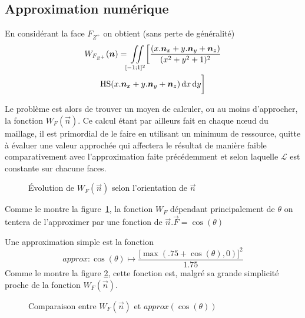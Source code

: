 \documentclass[10pt,a4paper,twoside, twocolumn]{report}
\newcommand*{\rootPath}{../}
\begin{document}
\subsection{Approximation numérique}


En considérant la face $F_{Z^+}$ on obtient (sans perte de généralité)
\begin{multline}
	W_{F_{Z^+}}(\vec n) = \iint\limits_{[-1;1]^2} \biggl[\frac{(x.\vec n_x+y.\vec n_y + \vec n_z)}{(x^2+y^2+1)^2} \\
	\Hs(x.\vec n_x+y.\vec n_y + \vec n_z)\, \mathrm dx\, \mathrm dy\biggr]
\end{multline}

Le problème est alors de trouver un moyen de calculer, ou au moins d'approcher, la fonction $W_F(\vec n)$. Ce calcul étant par ailleurs fait  en chaque nœud du maillage, il est primordial de le faire en utilisant un minimum de ressource, quitte à évaluer une valeur approchée qui affectera le résultat de manière faible comparativement avec l'approximation faite précédemment et selon laquelle $\mathcal L$ est constante sur chacune faces.

\begin{figure}[!ht]\centering
	
	\caption{Évolution de $W_F(\vec n)$ selon l'orientation de $\vec n$ }
	\label{fig:curve:w_theta_phi}
\end{figure}

Comme le montre la figure~\ref{fig:curve:w_theta_phi}, la fonction $W_F$ dépendant principalement de $\theta$ on tentera de l'approximer par une fonction de $\vec n.\vec F = \cos(\theta)$

Une approximation simple est la fonction
\begin{equation}
	approx : \cos(\theta)\mapsto
	\frac{\bigl[\max\left(.75 + \cos(\theta), 0\right)\bigr]^2}{1.75}
\end{equation}
Comme le montre la figure \ref{fig:curve:w_approx}, cette fonction est, malgré sa grande simplicité proche de la fonction $W_F(\vec n)$.

\begin{figure}[!ht]\centering

	\caption{Comparaison entre $W_F(\vec n)$ et $approx(\cos(\theta))$ }
	\label{fig:curve:w_approx}
\end{figure}
\end{document}
